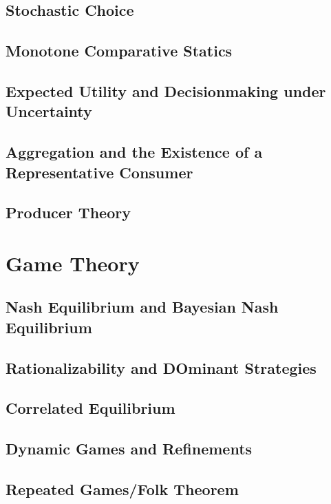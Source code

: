 \documentclass[12pt,openany]{report}
\theoremstyle{indented}
\numberwithin{definition}{section}
\numberwithin{theorem}{section}
\numberwithin{example}{section}
\begin{document}
\chapter{Stochastic Choice}

\chapter{Monotone Comparative Statics}

\chapter{Expected Utility and Decisionmaking under Uncertainty}

\chapter{Aggregation and the Existence of a Representative Consumer}

\chapter{Producer Theory}

\part{Game Theory}

\chapter{Nash Equilibrium and Bayesian Nash Equilibrium}

\chapter{Rationalizability and DOminant Strategies}

\chapter{Correlated Equilibrium}

\chapter{Dynamic Games and Refinements}

\chapter{Repeated Games/Folk Theorem}
\end{document}
